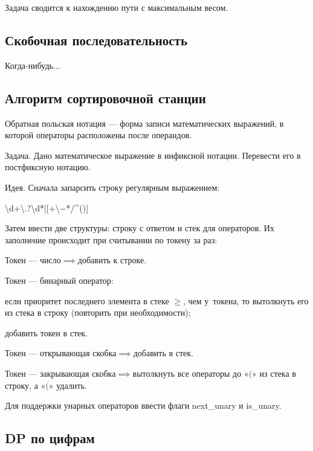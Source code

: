 Задача сводится к нахождению пути с {\ital максимальным весом}.

\subsection{Скобочная последовательность}

Когда-нибудь...

\newpage
\subsection{Алгоритм сортировочной станции}

{\bold Обратная польская нотация} --- форма записи математических выражений, в которой операторы расположены {\ital после} операндов.

\begin{theorem}
{\bold Задача.} Дано математическое выражение в инфиксной нотации. Перевести его в постфиксную нотацию.
\end{theorem}

{\bold Идея.} Сначала запарсить строку {\ital регулярным выражением}:

{\centering\textbackslash d+\textbackslash.?\textbackslash d*|[+\textbackslash$-$*/\^{}()]\par}
Затем ввести две структуры: {\ital строку} с ответом и {\ital стек} для операторов. Их заполнение происходит при считывании по токену за раз:
\begin{list*}[][\#]
\item Токен --- {\ital число}$\implies$добавить к строке.
\item Токен --- {\ital бинарный оператор}:
\begin{list*}[2]
\item если приоритет последнего элемента в стеке $\geq$, чем у~токена, то вытолкнуть его из стека в строку {\ital\color{desc} (повторить при необходимости)};
\item добавить токен в стек.
\end{list*}
\item Токен --- {\ital открывающая скобка}$\implies$добавить в стек.
\item Токен --- {\ital закрывающая скобка}$\implies$вытолкнуть все операторы до «$($» из стека в строку, а «$($» удалить.  
\end{list*}
Для поддержки унарных операторов ввести флаги {\ital next\_unary} и {\ital is\_unary}.

\subsection{DP по цифрам}

